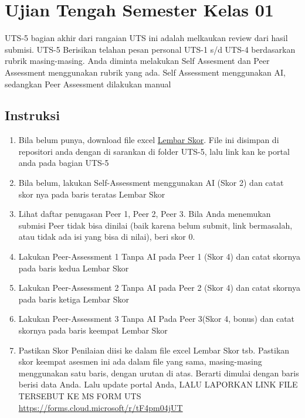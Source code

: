 \documentclass[
  letterpaper,
  DIV=11,
  numbers=noendperiod]{scrreprt}
\providecommand{\tightlist}{%
  \setlength{\itemsep}{0pt}\setlength{\parskip}{0pt}}
\begin{document}

\chapter*{Ujian Tengah Semester Kelas
01}\label{ujian-tengah-semester-kelas-01}


UTS-5 bagian akhir dari rangaian UTS ini adalah melkaukan review dari
hasil submisi. UTS-5 Berisikan telahan pesan personal UTS-1 s/d UTS-4
berdasarkan rubrik masing-masing. Anda diminta melakukan Self Assesment
dan Peer Assessment menggunakan rubrik yang ada. Self Assessment
menggunakan AI, sedangkan Peer Assessment dilakukan manual

\section*{Instruksi}\label{instruksi}


\begin{enumerate}
\def\labelenumi{\arabic{enumi}.}
\tightlist
\item
  Bila belum punya, download file excel
  \href{./asesmen/UTS-5_Skor.xlsx}{Lembar Skor}. File ini disimpan di
  repositori anda dengan di sarankan di folder UTS-5, lalu link kan ke
  portal anda pada bagian UTS-5
\item
  Bila belum, lakukan Self-Assessment menggunakan AI (Skor 2) dan catat
  skor nya pada baris teratas Lembar Skor
\item
  Lihat daftar penugasan Peer 1, Peer 2, Peer 3. Bila Anda menemukan
  submisi Peer tidak bisa dinilai (baik karena belum submit, link
  bermasalah, atau tidak ada isi yang bisa di nilai), beri skor 0.
\item
  Lakukan Peer-Assessment 1 Tanpa AI pada Peer 1 (Skor 4) dan catat
  skornya pada baris kedua Lembar Skor
\item
  Lakukan Peer-Assessment 2 Tanpa AI pada Peer 2 (Skor 4) dan catat
  skornya pada baris ketiga Lembar Skor
\item
  Lakukan Peer-Assessment 3 Tanpa AI Pada Peer 3(Skor 4, bonus) dan
  catat skornya pada baris keempat Lembar Skor
\item
  Pastikan Skor Penilaian diisi ke dalam file excel Lembar Skor tsb.
  Pastikan skor keempat asesmen ini ada dalam file yang sama,
  masing-masing menggunakan satu baris, dengan urutan di atas. Berarti
  dimulai dengan baris berisi data Anda. Lalu update portal Anda, LALU
  LAPORKAN LINK FILE TERSEBUT KE MS FORM UTS
  \url{https://forms.cloud.microsoft/r/tF4pm04jUT}
\end{enumerate}
\end{document}
